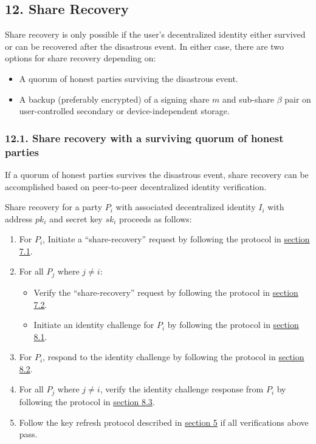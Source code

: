 \documentclass[
]{article}
\providecommand{\tightlist}{%
  \setlength{\itemsep}{0pt}\setlength{\parskip}{0pt}}
\begin{document}
\hypertarget{share-recovery}{%
\subsection{12. Share Recovery}\label{share-recovery}}

Share recovery is only possible if the user's decentralized identity
either survived or can be recovered after the disastrous event. In
either case, there are two options for share recovery depending on:

\begin{itemize}
\tightlist
\item
  A quorum of honest parties surviving the disastrous event.
\item
  A backup (preferably encrypted) of a signing share \(m\) and sub-share
  \(\beta\) pair on user-controlled secondary or device-independent
  storage.
\end{itemize}

\hypertarget{share-recovery-quorum}{%
\subsubsection{12.1. Share recovery with a surviving quorum of honest
parties}\label{share-recovery-quorum}}

If a quorum of honest parties survives the disastrous event, share
recovery can be accomplished based on peer-to-peer decentralized
identity verification.

Share recovery for a party \(P_i\) with associated decentralized
identity \(I_i\) with address \(pk_i\) and secret key \(sk_i\) proceeds
as follows:

\begin{enumerate}
\def\labelenumi{\arabic{enumi}.}
\tightlist
\item
  For \(P_i\), Initiate a ``share-recovery'' request by following the
  protocol in
  \protect\hyperlink{identity-authed-request-initiation}{section 7.1}.
\item
  For all \(P_j\) where \(j \neq i\):

  \begin{itemize}
  \tightlist
  \item
    Verify the ``share-recovery'' request by following the protocol in
    \protect\hyperlink{identity-authed-request-verification}{section
    7.2}.
  \item
    Initiate an identity challenge for \(P_i\) by following the protocol
    in \protect\hyperlink{identity-challenge-initiation}{section 8.1}.
  \end{itemize}
\item
  For \(P_i\), respond to the identity challenge by following the
  protocol in \protect\hyperlink{identity-challenge-response}{section
  8.2}.
\item
  For all \(P_j\) where \(j \neq i\), verify the identity challenge
  response from \(P_i\) by following the protocol in
  \protect\hyperlink{identity-challenge-verification}{section 8.3}.
\item
  Follow the key refresh protocol described in
  \protect\hyperlink{key-refresh}{section 5} if all verifications above
  pass.
\end{enumerate}
\end{document}
